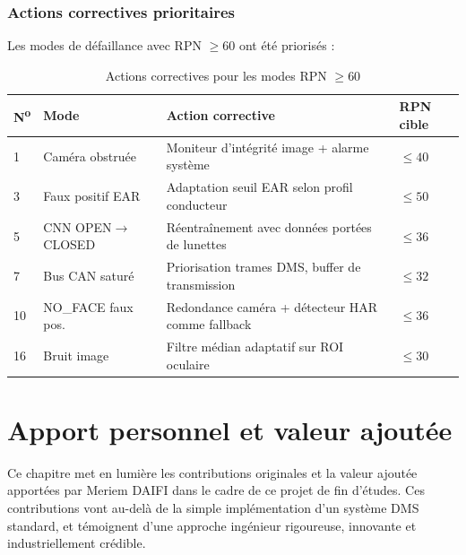 \documentclass[12pt,a4paper]{report}
\begin{document}
\subsection{Actions correctives prioritaires}

Les modes de d\'efaillance avec RPN $\geq 60$ ont \'et\'e prioris\'es :

\begin{table}[H]
\centering
\caption{Actions correctives pour les modes RPN $\geq 60$}
\label{tab:corrective_actions}
\begin{tabular}{C{0.5cm} L{3.5cm} L{5.5cm} C{1.5cm}}
\toprule
\textbf{N\textsuperscript{o}} & \textbf{Mode} & \textbf{Action corrective} & \textbf{RPN cible} \\
 & Cam\'era obstru\'ee & Moniteur d'int\'egrit\'e image + alarme syst\`eme & $\leq 40$ \\
3 & Faux positif EAR & Adaptation seuil EAR selon profil conducteur & $\leq 50$ \\
5 & CNN OPEN$\to$CLOSED & R\'eentra\^inement avec donn\'ees port\'ees de lunettes & $\leq 36$ \\
7 & Bus CAN satur\'e & Priorisation trames DMS, buffer de transmission & $\leq 32$ \\
10 & NO\_FACE faux pos. & Redondance cam\'era + d\'etecteur HAR comme fallback & $\leq 36$ \\
16 & Bruit image & Filtre m\'edian adaptatif sur ROI oculaire & $\leq 30$ \\
\bottomrule
\end{tabular}
\end{table}

\clearpage

\chapter{Apport personnel et valeur ajout\'ee}
\label{chap:apport}

Ce chapitre met en lumi\`ere les contributions originales et la valeur ajout\'ee apport\'ees par Meriem DAIFI dans le cadre de ce projet de fin d'\'etudes. Ces contributions vont au-del\`a de la simple impl\'ementation d'un syst\`eme DMS standard, et t\'emoignent d'une approche ingénieur rigoureuse, innovante et industriellement cr\'edible.
\end{document}
